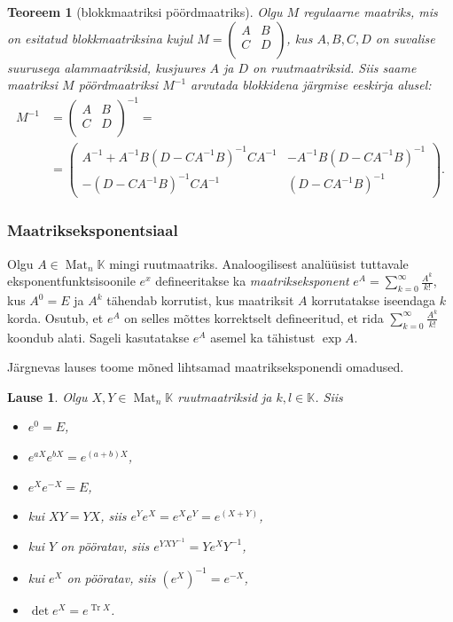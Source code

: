 \documentclass[12pt,a4paper,oneside]{article}
\theoremstyle{plain}
\newtheorem{teoreem}{Teoreem}[section]
\newtheorem{lause}{Lause}[section]
\theoremstyle{definition}
\numberwithin{equation}{section}
\def\K{{\mathbb K}}
\DeclareMathOperator{\Mat}{Mat}
\DeclareMathOperator{\Tr}{Tr}
\begin{document}
\begin{teoreem}[blokkmaatriksi pöördmaatriks]
Olgu $M$ regulaarne maatriks, mis on esitatud blokkmaatriksina kujul 
$M = \begin{pmatrix} A & B \\ C & D \\ \end{pmatrix}$, kus $A, B, C, D$ 
on suvalise suurusega alammaatriksid, kusjuures $A$ ja $D$ on 
ruutmaatriksid. Siis saame maatriksi $M$ pöördmaatriksi $M^{-1}$ 
arvutada blokkidena järgmise eeskirja alusel:
\begin{align*}
M^{-1} &= \begin{pmatrix}
A & B \\ C & D \\
\end{pmatrix}^{-1} = \qquad\qquad\qquad\qquad\qquad \\
&= \begin{pmatrix}
A^{-1}+A^{-1}B\left(D-CA^{-1}B\right)^{-1}CA^{-1} & 
	-A^{-1}B\left(D-CA^{-1}B\right)^{-1} \\
-\left(D- CA^{-1}B\right)^{-1}CA^{-1} & \left(D-CA^{-1}B\right)^{-1}
\end{pmatrix}.
\end{align*}
\end{teoreem}

\subsubsection*{Maatrikseksponentsiaal}

Olgu $A \in \Mat_n\K$ mingi ruutmaatriks. Analoogilisest analüüsist 
tuttavale eksponentfunktsisoonile $e^x$ defineeritakse ka 
\emph{maatrikseksponent} $e^A = \sum_{k = 0}^{\infty} \frac{A^k}{k!}$, 
kus $A^0 = E$ ja $A^k$ tähendab korrutist, kus maatriksit $A$ 
korrutatakse iseendaga $k$ korda. Osutub, et $e^A$ on selles mõttes 
korrektselt defineeritud, et rida 
$\sum_{k = 0}^{\infty} \frac{A^k}{k!}$ koondub alati. 
Sageli kasutatakse $e^A$ asemel ka tähistust $\exp A$.

Järgnevas lauses toome mõned lihtsamad maatrikseksponendi omadused.
\begin{lause}
Olgu $X, Y \in \Mat_n \K$ ruutmaatriksid ja $k, l \in \K$. Siis
\begin{itemize}
\item $e^0 = E$,
\item $e^{aX}e^{bX} = e^{\left(a+b\right)X}$,
\item $e^{X} e^{-X} = E$,
\item kui $XY = YX$, siis $e^Y e^X = e^X e^Y = e^{\left(X + Y\right)}$,
\item kui $Y$ on pööratav, siis $e^{YXY^{-1}} = Ye^XY^{-1}$,
\item kui $e^X$ on pööratav, siis $\left(e^X\right)^{-1} = e^{-X}$,
\item $\det e^X = e^{\Tr X}$.
\end{itemize}
\end{lause}
\end{document}
